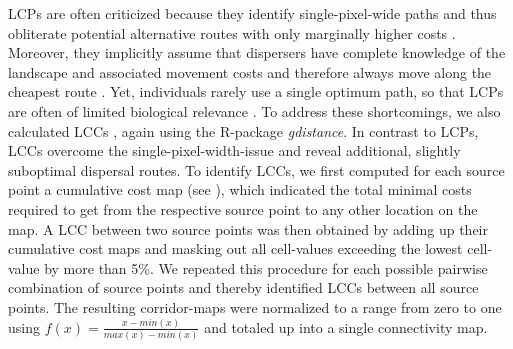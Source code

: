 \documentclass[abstract=on,10pt,a4paper,bibliography=totocnumbered]{scrartcl}
\begin{document}
LCPs are often criticized because they identify single-pixel-wide paths and thus
obliterate potential alternative routes with only marginally higher costs
\citep{Pinto.2009}. Moreover, they implicitly assume that dispersers have
complete knowledge of the landscape and associated movement costs and therefore
always move along the cheapest route \citep{Carroll.2012}. Yet, individuals
rarely use a single optimum path, so that LCPs are often of limited biological
relevance \citep{Pinto.2009, Pullinger.2010}. To address these shortcomings, we
also calculated LCCs \citep{Pinto.2009, Sawyer.2011}, again using the R-package
\textit{gdistance}. In contrast to LCPs, LCCs overcome the
single-pixel-width-issue and reveal additional, slightly suboptimal dispersal
routes. To identify LCCs, we first computed for each source point a cumulative
cost map (see ), which indicated the total minimal costs
required to get from the respective source point to any other location on the
map. A LCC between two source points was then obtained by adding up their
cumulative cost maps and masking out all cell-values exceeding the lowest
cell-value by more than 5\%. We repeated this procedure for each possible
pairwise combination of source points and thereby identified LCCs between all
source points. The resulting corridor-maps were normalized to a range from zero
to one using \(f(x) = \frac{x - min(x)}{max(x) - min(x)}\) and totaled up into a
single connectivity map.
\end{document}
